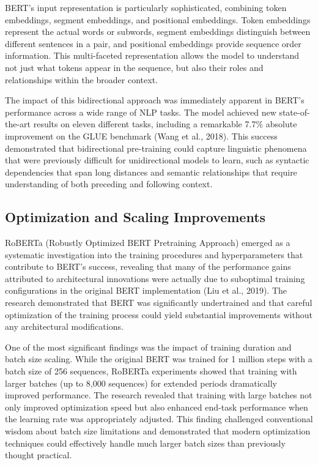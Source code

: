 \documentclass[
  titlepage]{article}
\begin{document}
BERT's input representation is particularly sophisticated, combining
token embeddings, segment embeddings, and positional embeddings. Token
embeddings represent the actual words or subwords, segment embeddings
distinguish between different sentences in a pair, and positional
embeddings provide sequence order information. This multi-faceted
representation allows the model to understand not just what tokens
appear in the sequence, but also their roles and relationships within
the broader context.

The impact of this bidirectional approach was immediately apparent in
BERT's performance across a wide range of NLP tasks. The model achieved
new state-of-the-art results on eleven different tasks, including a
remarkable 7.7\% absolute improvement on the GLUE benchmark (Wang et
al., 2018). This success demonstrated that bidirectional pre-training
could capture linguistic phenomena that were previously difficult for
unidirectional models to learn, such as syntactic dependencies that span
long distances and semantic relationships that require understanding of
both preceding and following context.

\subsection{Optimization and Scaling
Improvements}\label{optimization-and-scaling-improvements}

RoBERTa (Robustly Optimized BERT Pretraining Approach) emerged as a
systematic investigation into the training procedures and
hyperparameters that contribute to BERT's success, revealing that many
of the performance gains attributed to architectural innovations were
actually due to suboptimal training configurations in the original BERT
implementation (Liu et al., 2019). The research demonstrated that BERT
was significantly undertrained and that careful optimization of the
training process could yield substantial improvements without any
architectural modifications.

One of the most significant findings was the impact of training duration
and batch size scaling. While the original BERT was trained for 1
million steps with a batch size of 256 sequences, RoBERTa experiments
showed that training with larger batches (up to 8,000 sequences) for
extended periods dramatically improved performance. The research
revealed that training with large batches not only improved optimization
speed but also enhanced end-task performance when the learning rate was
appropriately adjusted. This finding challenged conventional wisdom
about batch size limitations and demonstrated that modern optimization
techniques could effectively handle much larger batch sizes than
previously thought practical.
\end{document}
